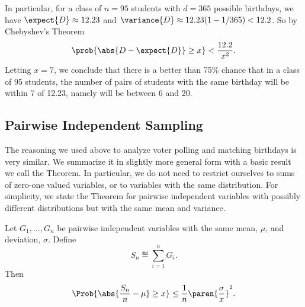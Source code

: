 In particular, for a class of $n= 95$ students with $d=365$ possible
birthdays, we have $\expect{D} \approx 12.23$ and $\variance{D} \approx 12.23 (1-
1/365) < 12.2$.  So by Chebyshev's Theorem
\[
\prob{\abs{D - \expect{D}} \geq x} < \frac{12.2}{x^2}.
\]
Letting $x=7$, we conclude that there is a better than 75\% chance
that in a class of 95 students, the number of pairs of students with
the same birthday will be within 7 of 12.23, namely will be between 6
and 20.



\subsection{Pairwise Independent Sampling}

The reasoning we used above to analyze voter polling and matching
birthdays is very similar.  We summarize it in slightly more general form
with a basic result we call the 
Theorem.  In particular, we do not need to restrict ourselves to sums of
zero-one valued variables, or to variables with the same distribution.
For simplicity, we state the Theorem for pairwise independent variables
with possibly different distributions but with the same mean and variance.

\begin{theorem}\label{th:pairwise-sampling}
Let $G_1, \dots, G_n$ be pairwise independent variables with the same
mean, $\mu$, and deviation, $\sigma$.  Define
\begin{equation}\label{ln14.Sn}
S_n \eqdef \sum_{i=1}^n G_i.
\end{equation}
Then
\[
\Prob{\abs{\frac{S_n}{n} - \mu} \geq x}
    \leq \frac{1}{n} \paren{\frac{\sigma}{x}}^2.
\]
\end{theorem}

